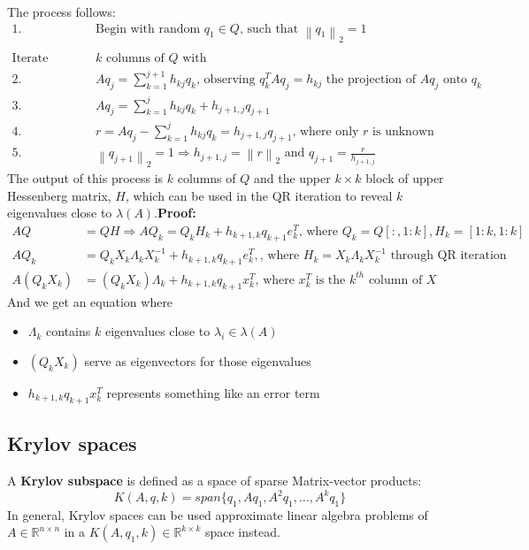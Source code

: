 \documentclass{article}
\newcommand{\norm}[2]{\left\lVert#1\right\rVert_#2}
\begin{document}
The process follows:
\begin{align*}
    1. \; & \textrm{Begin with random } q_1 \in Q \textrm{, such that } \norm{q_1}{2} = 1\\ \\
    \textrm{Iterate through each of the first } & k \textrm{ columns of $Q$ with }\\
    2. \; & Aq_j = \sum_{k = 1}^{j+1} h_{kj}q_k \textrm{, observing } q_k^TAq_j = h_{kj} \textrm{ the projection of } Aq_j \textrm{ onto } q_k\\
    3. \; & Aq_j = \sum_{k = 1}^{j} h_{kj}q_k + h_{j+1, j}q_{j+1}\\
    4. \; & r = Aq_j - \sum_{k = 1}^{j} h_{kj}q_k = h_{j+1, j}q_{j+1} \textrm{, where only $r$ is unknown}\\
    5. \;& \norm{q_{j+1}}{2} = 1 \Longrightarrow h_{j+1, j} = \norm{r}{2} \textrm{ and } q_{j+1} = \frac{r}{h_{j+1, j}}
\end{align*}
The output of this process is $k$ columns of $Q$ and the upper $k \times k$ block of upper Hessenberg matrix, $H$, which can be used in the QR iteration to reveal $k$ eigenvalues close to $\lambda(A)$.\textbf{Proof:}
\begin{align*}
    AQ &= QH \Longrightarrow AQ_k = Q_kH_k + h_{k+1,k}q_{k+1}e_k^T \textrm{, where } Q_k = Q[:, 1:k], H_k = [1:k, 1:k]\\
    AQ_k &= Q_kX_k\Lambda_k X_k^{-1} + h_{k+1,k}q_{k+1}e_k^T, \textrm{, where } H_k = X_k\Lambda_k X_k^{-1} \textrm{ through QR iteration}\\
    A(Q_kX_k) &= (Q_kX_k)\Lambda_k + h_{k+1,k}q_{k+1}x_k^T \textrm{, where } x_k^T \textrm{ is the $k^{th}$ column of } X
\end{align*}
And we get an equation where 
\begin{itemize}
    \item $\Lambda_k$ contains $k$ eigenvalues close to $\lambda_i \in \lambda(A)$
    \item $(Q_kX_k)$ serve as eigenvectors for those eigenvalues
    \item $h_{k+1,k}q_{k+1}x_k^T$ represents something like an error term
\end{itemize}

\subsection{Krylov spaces}
A \textbf{Krylov subspace} is defined as a space of sparse Matrix-vector products:
\begin{equation*}
    K(A, q, k) = span\{q_1, Aq_1, A^2q_1, \dots, A^kq_1 \}
\end{equation*}
In general, Krylov spaces can be used approximate linear algebra problems of $A \in \mathbb{R}^{n \times n}$ in a $K(A, q_1, k) \in \mathbb{R}^{k \times k}$ space instead.
\end{document}
